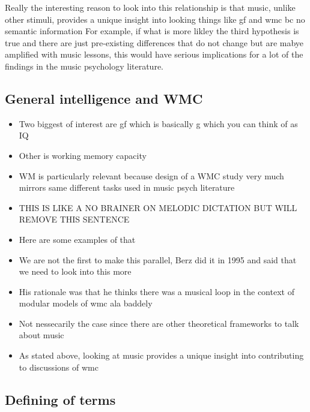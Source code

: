 \documentclass[]{book}
\providecommand{\tightlist}{%
  \setlength{\itemsep}{0pt}\setlength{\parskip}{0pt}}
\theoremstyle{definition}
\theoremstyle{definition}
\theoremstyle{definition}
\theoremstyle{remark}
\begin{document}
Really the interesting reason to look into this relationship is that
music, unlike other stimuli, provides a unique insight into looking
things like gf and wmc bc no semantic information For example, if what
is more likley the third hypothesis is true and there are just
pre-existing differences that do not change but are mabye amplified with
music lessons, this would have serious implications for a lot of the
findings in the music psychology literature.

\hypertarget{general-intelligence-and-wmc}{%
\subsection{General intelligence and
WMC}\label{general-intelligence-and-wmc}}

\begin{itemize}
\tightlist
\item
  Two biggest of interest are gf which is basically g which you can
  think of as IQ
\item
  Other is working memory capacity
\item
  WM is particularly relevant because design of a WMC study very much
  mirrors same different tasks used in music psych literature
\item
  THIS IS LIKE A NO BRAINER ON MELODIC DICTATION BUT WILL REMOVE THIS
  SENTENCE
\item
  Here are some examples of that
\item
  We are not the first to make this parallel, Berz did it in 1995 and
  said that we need to look into this more
\item
  His rationale was that he thinks there was a musical loop in the
  context of modular models of wmc ala baddely
\item
  Not nessecarily the case since there are other theoretical frameworks
  to talk about music
\item
  As stated above, looking at music provides a unique insight into
  contributing to discussions of wmc
\end{itemize}

\hypertarget{defining-of-terms}{%
\subsection{Defining of terms}\label{defining-of-terms}}
\end{document}
